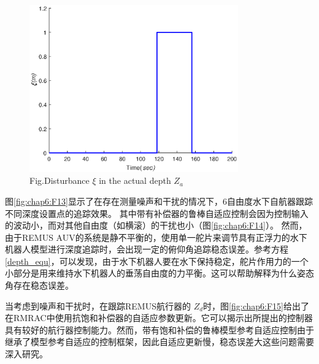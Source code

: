 \begin{figure}[!htp]%
\centering
\includegraphics[width=9cm]{figure/chap6/Fig_6_disturbance.eps}
\label{fig:chap6:F12}
 {Fig.}{Disturbance $\xi$ in the actual depth $Z_a$}
\end{figure}


图\ref {fig:chap6:F13}显示了在存在测量噪声和干扰的情况下，6自由度水下自航器跟踪不同深度设置点的追踪效果。 其中带有补偿器的鲁棒自适应控制会因为控制输入的波动小，而对其他自由度（如横滚）的干扰也小（图\ref {fig:chap6:F14}）。 然而，由于REMUS AUV的系统是静不平衡的，使用单一舵片来调节具有正浮力的水下机器人模型进行深度追踪时，会出现一定的俯仰角追踪稳态误差。参考方程\ref{depth_equ}，可以发现，由于水下机器人要在水下保持稳定，舵片作用力的一个小部分是用来维持水下机器人的垂荡自由度的力平衡。这可以帮助解释为什么姿态角存在稳态误差。

当考虑到噪声和干扰时，在跟踪REMUS航行器的 $Z_{d}$时，图\ref {fig:chap6:F15}给出了在RMRAC中使用抗饱和补偿器的自适应参数更新。它可以揭示出所提出的控制器具有较好的航行器控制能力。然而，带有饱和补偿的鲁棒模型参考自适应控制由于继承了模型参考自适应的控制框架，因此自适应更新慢，稳态误差大这些问题需要深入研究。


